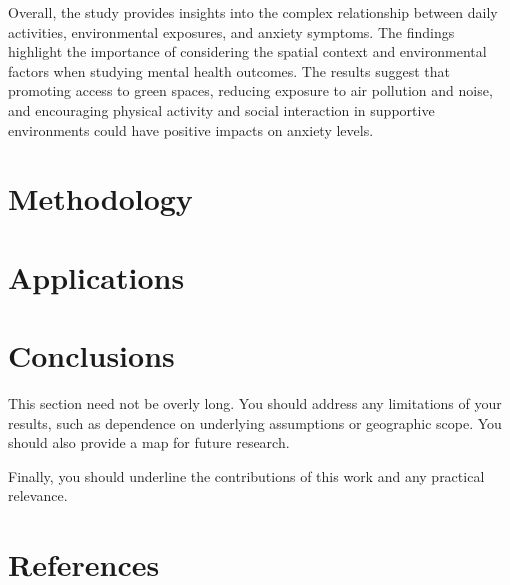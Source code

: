 \documentclass[
  letterpaper,
  authoryear]{elsarticle}
\begin{document}
Overall, the study provides insights into the complex relationship
between daily activities, environmental exposures, and anxiety symptoms.
The findings highlight the importance of considering the spatial context
and environmental factors when studying mental health outcomes. The
results suggest that promoting access to green spaces, reducing exposure
to air pollution and noise, and encouraging physical activity and social
interaction in supportive environments could have positive impacts on
anxiety levels.


\hypertarget{methodology}{%
\section{Methodology}\label{methodology}}


\hypertarget{applications}{%
\section{Applications}\label{applications}}


\hypertarget{conclusions}{%
\section{Conclusions}\label{conclusions}}

This section need not be overly long. You should address any limitations
of your results, such as dependence on underlying assumptions or
geographic scope. You should also provide a map for future research.

Finally, you should underline the contributions of this work and any
practical relevance.


\hypertarget{references}{%
\section*{References}\label{references}}


\renewcommand{\bibsection}{}

\end{document}
